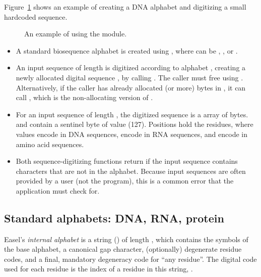 Figure~\ref{fig:alphabet_example} shows an example of creating a DNA
alphabet and digitizing a small hardcoded sequence.

\begin{figure}

\caption{An example of using the  module.}
\label{fig:alphabet_example}
\end{figure}

\begin{itemize}
\item A standard biosequence alphabet is created using
, where  can be
, , or .

\item An input sequence  of length  is digitized
according to alphabet , creating a newly allocated digital
sequence , by calling . The caller must free  using .
Alternatively, if the caller has already allocated  (or
more) bytes in , it can call , which is the non-allocating version of
.

\item For an input sequence of length , the digitized
sequence  is a  array of 
bytes.  and  contain a sentinel byte of
value  (127).  Positions  hold the
residues, where values  encode  in DNA
sequences,  encode  in RNA sequences, and
 encode  in amino acid sequences.

\item Both sequence-digitizing functions return  if
the input sequence contains characters that are not in the
alphabet. Because input sequences are often provided by a user (not
the program), this is a common error that the application must check
for.
\end{itemize}

\subsection{Standard alphabets: DNA, RNA, protein}

Easel's \emph{internal alphabet} is a string () of
length , which contains the  symbols of the base
alphabet, a canonical gap character, (optionally) degenerate residue
codes, and a final, mandatory degeneracy code for ``any residue''.
The digital code used for each residue is the index of a residue in
this string, .

